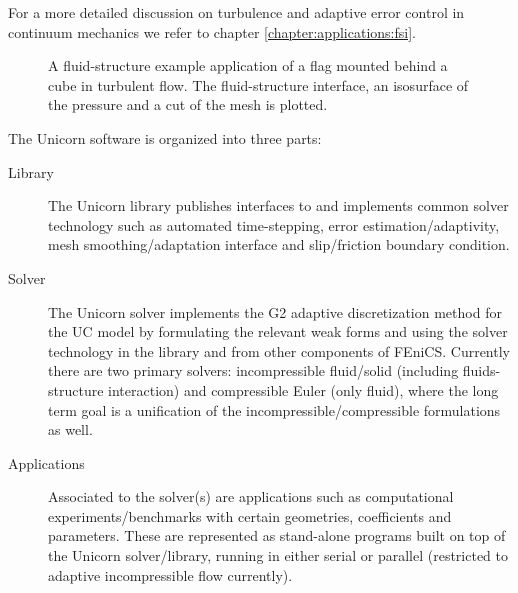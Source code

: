For a more detailed discussion on turbulence and adaptive error
control in continuum mechanics we refer to
chapter \ref{chapter:applications:fsi}.

\begin{figure}[!h]
\caption{
A fluid-structure example application of a flag mounted behind a cube in turbulent flow. The fluid-structure interface, an isosurface of the pressure and a cut of the mesh is plotted.
}
\label{fig:flag3D}
\end{figure}

The Unicorn software is organized into three parts:
\begin{description}
\item[Library]
The Unicorn library publishes interfaces to and implements common
solver technology such as automated time-stepping, error
estimation/adaptivity, mesh smoothing/adaptation interface and
slip/friction boundary condition.
\item[Solver]
The Unicorn solver implements the G2 adaptive discretization method
for the UC model by formulating the relevant weak forms and using the
solver technology in the library and from other components of
FEniCS. Currently there are two primary solvers: incompressible
fluid/solid (including fluids-structure interaction) and compressible
Euler (only fluid), where the long term goal is a unification of the
incompressible/compressible formulations as well.
\item[Applications]
Associated to the solver(s) are applications such as computational
experiments/benchmarks with certain geometries, coefficients and
parameters. These are represented as stand-alone programs built on top
of the Unicorn solver/library, running in either serial or parallel
(restricted to adaptive incompressible flow currently).
\end{description}

